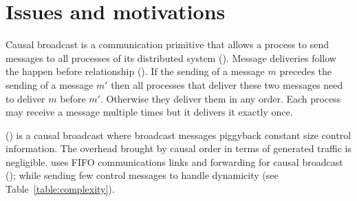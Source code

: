 
\section{Issues and motivations}

Causal broadcast is a communication primitive that allows a process to send
messages to all processes of its distributed system (\REF). Message deliveries
follow the happen before relationship (\REF). If the sending of a message $m$
precedes the sending of a message $m'$ then all processes that deliver these two
messages need to deliver $m$ before $m'$. Otherwise they deliver them in any
order. Each process may receive a message multiple times but it delivers it
exactly once.

\PCBROADCAST (\REF) is a causal broadcast where broadcast messages piggyback
constant size control information. The overhead brought by causal order in terms
of generated traffic is negligible.  \PCBROADCAST uses FIFO communications links
and forwarding for causal broadcast (\REF); while sending few control messages
to handle dynamicity (see Table~\ref{table:complexity}).


